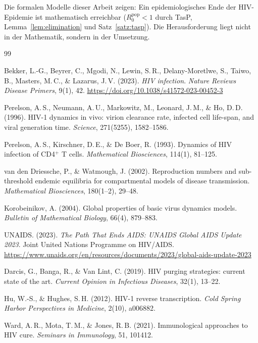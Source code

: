 ﻿\documentclass[a4paper,12pt]{article}
\theoremstyle{definition}
\begin{document}
Die formalen Modelle dieser Arbeit zeigen: Ein epidemiologisches Ende der HIV-Epidemie
ist mathematisch erreichbar ($R_0^{\text{pop}} < 1$ durch TasP, Lemma~\ref{lem:elimination}
und Satz~\ref{satz:tasp}). Die Herausforderung liegt nicht in der Mathematik,
sondern in der Umsetzung.

\begin{thebibliography}{99}

Bekker, L.-G., Beyrer, C., Mgodi, N., Lewin, S.\,R., Delany-Moretlwe, S.,
Taiwo, B., Masters, M.\,C., \& Lazarus, J.\,V. (2023).
\textit{HIV infection}.
\textit{Nature Reviews Disease Primers}, 9(1), 42.
\url{https://doi.org/10.1038/s41572-023-00452-3}

Perelson, A.\,S., Neumann, A.\,U., Markowitz, M., Leonard, J.\,M., \& Ho, D.\,D. (1996).
HIV-1 dynamics in vivo: virion clearance rate, infected cell life-span, and viral generation time.
\textit{Science}, 271(5255), 1582--1586.

Perelson, A.\,S., Kirschner, D.\,E., \& De Boer, R. (1993).
Dynamics of HIV infection of CD4$^+$ T cells.
\textit{Mathematical Biosciences}, 114(1), 81--125.

van den Driessche, P., \& Watmough, J. (2002).
Reproduction numbers and sub-threshold endemic equilibria for compartmental
models of disease transmission.
\textit{Mathematical Biosciences}, 180(1--2), 29--48.

Korobeinikov, A. (2004).
Global properties of basic virus dynamics models.
\textit{Bulletin of Mathematical Biology}, 66(4), 879--883.

UNAIDS. (2023).
\textit{The Path That Ends AIDS: UNAIDS Global AIDS Update 2023}.
Joint United Nations Programme on HIV/AIDS.
\url{https://www.unaids.org/en/resources/documents/2023/global-aids-update-2023}

Darcis, G., Banga, R., \& Van Lint, C. (2019).
HIV purging strategies: current state of the art.
\textit{Current Opinion in Infectious Diseases}, 32(1), 13--22.

Hu, W.-S., \& Hughes, S.\,H. (2012).
HIV-1 reverse transcription.
\textit{Cold Spring Harbor Perspectives in Medicine}, 2(10), a006882.

Ward, A.\,R., Mota, T.\,M., \& Jones, R.\,B. (2021).
Immunological approaches to HIV cure.
\textit{Seminars in Immunology}, 51, 101412.


\end{thebibliography}
\end{document}

